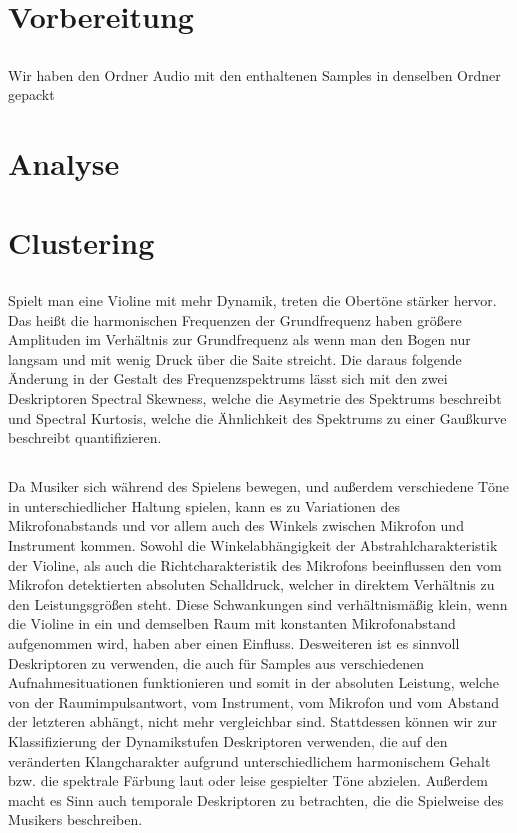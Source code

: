 \section{Vorbereitung}
\label{sec:preperation}
\subsection{}
Wir haben den Ordner Audio mit den enthaltenen Samples in denselben Ordner gepackt


\section{Analyse}
\label{sec:analyse}




\section{Clustering}
\label{sec:cluster}

\subsection{}
Spielt man eine Violine mit mehr Dynamik, treten die Obertöne stärker hervor.
Das heißt die harmonischen Frequenzen der Grundfrequenz haben größere Amplituden im Verhältnis zur Grundfrequenz als wenn man den Bogen nur langsam und mit wenig Druck über die Saite streicht.  
Die daraus folgende Änderung in der Gestalt des Frequenzspektrums lässt sich mit den zwei Deskriptoren Spectral Skewness, welche die Asymetrie des Spektrums beschreibt und Spectral Kurtosis, welche die Ähnlichkeit des Spektrums zu einer Gaußkurve beschreibt quantifizieren. 

\subsection{}

Da Musiker sich während des Spielens bewegen, und außerdem verschiedene Töne in unterschiedlicher Haltung spielen, kann es zu Variationen des Mikrofonabstands und vor allem auch des Winkels zwischen Mikrofon und Instrument kommen. 
Sowohl die Winkelabhängigkeit der Abstrahlcharakteristik der Violine, als auch die Richtcharakteristik des Mikrofons beeinflussen den vom Mikrofon detektierten absoluten Schalldruck, welcher in direktem Verhältnis zu den Leistungsgrößen steht. 
Diese Schwankungen sind verhältnismäßig klein, wenn die Violine in ein und demselben Raum mit konstanten Mikrofonabstand aufgenommen wird, haben aber einen Einfluss.
Desweiteren ist es sinnvoll Deskriptoren zu verwenden, die auch für Samples aus verschiedenen Aufnahmesituationen funktionieren und somit in der absoluten Leistung, welche von der Raumimpulsantwort, vom Instrument, vom Mikrofon und vom Abstand der letzteren abhängt, nicht mehr vergleichbar sind.
Stattdessen können wir zur Klassifizierung der Dynamikstufen Deskriptoren verwenden, die auf den veränderten Klangcharakter aufgrund unterschiedlichem harmonischem Gehalt bzw. die spektrale Färbung laut oder leise gespielter Töne abzielen.
Außerdem macht es Sinn auch temporale Deskriptoren zu betrachten, die die Spielweise des Musikers beschreiben.
